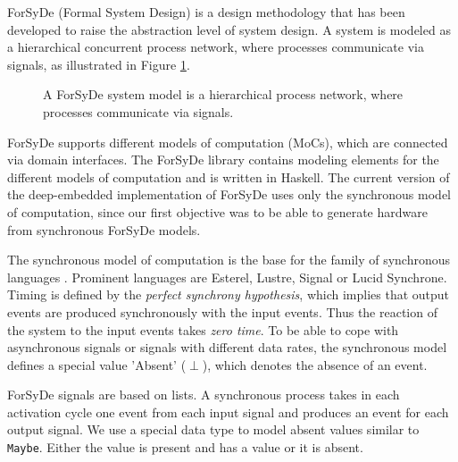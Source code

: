ForSyDe (Formal System Design) \cite{SanJan2004a} is a design methodology that has been developed to raise the abstraction level of system design. A system is modeled as a hierarchical concurrent process network, where processes communicate via signals, as illustrated in Figure \ref{fig:SystemModel}.

\begin{figure}[htb]
  \centering
  \resizebox{0.4\columnwidth}{!}{}
  \caption{A ForSyDe system model is a hierarchical process network, where processes communicate via signals.}
  \label{fig:SystemModel}
\end{figure}

ForSyDe supports different models of computation (MoCs), which are connected via domain interfaces. The ForSyDe library contains modeling elements for the different models of computation and is written in Haskell. The current version of the deep-embedded implementation of ForSyDe uses only the synchronous model of computation, since our first objective was to be able to generate hardware from synchronous ForSyDe models.

The synchronous model of computation is the base for the family of synchronous languages \cite{BenBer1991}. Prominent languages are Esterel, Lustre, Signal or Lucid Synchrone. Timing is defined by the \emph{perfect synchrony hypothesis}, which implies that output events are produced synchronously with the input events. Thus the reaction of the system to the input events takes \emph{zero time}. To be able to cope with asynchronous signals or signals with different data rates, the synchronous model defines a special value 'Absent' ($\perp$), which denotes the absence of an event.   

ForSyDe signals are based on lists. A synchronous process takes in each activation cycle one event from each input signal and produces an event for each output signal. We use a special data type to model absent values similar to \texttt{Maybe}. Either the value is present and has a value or it is absent.


